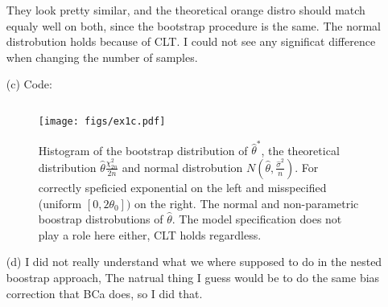 \documentclass[a4paper,12pt]{article}
\theoremstyle{breaktheorem}
\theoremstyle{exerciseStyle}
\theoremstyle{solutionStyle}
\begin{document}
\begin{enumerate}
\begin{figure}[h]
          \end{figure}

          They look pretty similar, and the theoretical orange distro should match equaly well on both, since
          the bootstrap procedure is the same. The normal distrobution holds because of
          CLT. I could not see any significat difference when changing the number of samples.
          \newpage
    \item[(c)]
          Code:
          \inputminted[linenos, breaklines, frame=lines]{python}{ex1c.py}


          \begin{figure}[h]
              \centering
              \texttt{[image: figs/ex1c.pdf]}
              \caption{Histogram of the bootstrap distribution of $\hat{\theta}^*$,
              the theoretical distribution $\hat \theta \frac{\chi^2_{2n}}{2n} $
              and normal distrobution $N(\hat \theta, \frac{\hat \sigma^2}{n})$.
              For correctly speficied exponential on the left and misspecified (uniform $[0,2 \theta_0])$ on the right.
              The normal and non-parametric boostrap distrobutions of $\hat \theta$.
              The model specification does not play a role here either, CLT holds regardless.}

          \end{figure}

          \newpage
    \item[(d)]
          I did not really understand what we where supposed to do in the nested boostrap approach,
          The natrual thing I guess would be to do the same bias correction that BCa does, so I did that.
          \inputminted[linenos, breaklines, frame=lines]{python}{ex1d2.py}


\end{enumerate}
\end{document}
